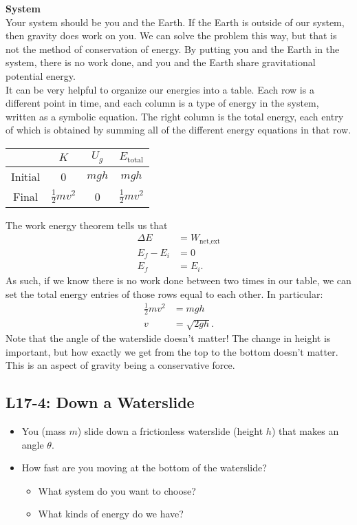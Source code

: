 \documentclass[]{article}
\newcommand{\Week}{17}
\begin{document}
\begin{TeacherMargin}
\noindent \textbf{System} \\
Your system should be you and the Earth. If the Earth is outside of our system, then gravity does work on you. We can solve the problem this way, but that is not the method of conservation of energy. By putting you and the Earth in the system, there is no work done, and you and the Earth share gravitational potential energy. \\

\noindent It can be very helpful to organize our energies into a table. Each row is a different point in time, and each column is a type of energy in the system, written as a symbolic equation. The right column is the total energy, each entry of which is obtained by summing all of the different energy equations in that row.
\begin{center}
\Large
\begin{tabular}{|c|c|c||c|}
	\hline
	& $K$ & $U_{g}$ & $E_{\text{total}}$ \\ \hline
	Initial & 0 & $mgh$ & $mgh$ \\ \hline
	Final & $\frac{1}{2}mv^{2}$ & 0 & $\frac{1}{2}mv^{2}$ \\ \hline
\end{tabular}
\end{center}
The work energy theorem tells us that
\begin{align*}
	\Delta E & = W_{\text{net,ext}} \\
	E_{f}-E_{i} & = 0 \\
	E_{f} & = E_{i}.
\end{align*}
As such, if we know there is no work done between two times in our table, we can set the total energy entries of those rows equal to each other. In particular:
\begin{align*}
	\frac{1}{2}mv^{2} & = mgh \\
	v & = \sqrt{2gh}.
\end{align*}
Note that the angle of the waterslide doesn't matter! The change in height is important, but how exactly we get from the top to the bottom doesn't matter. This is an aspect of gravity being a conservative force.
\end{TeacherMargin}
\begin{PresentSpace}
\vspace{-10pt}
\section*{L\Week-4: Down a Waterslide}
\vspace{-10pt}
\begin{itemize}
	\item You (mass $m$) slide down a frictionless waterslide (height $h$) that makes an angle $\theta$.
	\item How fast are you moving at the bottom of the waterslide?
	\begin{itemize}
		\item What system do you want to choose?
		\item What kinds of energy do we have?
	\end{itemize}
\end{itemize}
\end{PresentSpace}
\end{document}
